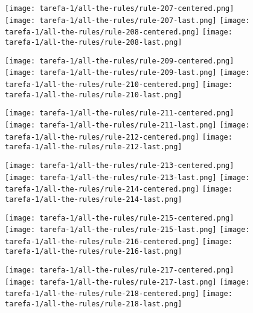 \begin{figure}[htbp]
  \centering
\texttt{[image: tarefa-1/all-the-rules/rule-207-centered.png]}
\texttt{[image: tarefa-1/all-the-rules/rule-207-last.png]}
\texttt{[image: tarefa-1/all-the-rules/rule-208-centered.png]}
\texttt{[image: tarefa-1/all-the-rules/rule-208-last.png]}
\end{figure}
\begin{figure}[htbp]
  \centering
\texttt{[image: tarefa-1/all-the-rules/rule-209-centered.png]}
\texttt{[image: tarefa-1/all-the-rules/rule-209-last.png]}
\texttt{[image: tarefa-1/all-the-rules/rule-210-centered.png]}
\texttt{[image: tarefa-1/all-the-rules/rule-210-last.png]}
\end{figure}
\begin{figure}[htbp]
  \centering
\texttt{[image: tarefa-1/all-the-rules/rule-211-centered.png]}
\texttt{[image: tarefa-1/all-the-rules/rule-211-last.png]}
\texttt{[image: tarefa-1/all-the-rules/rule-212-centered.png]}
\texttt{[image: tarefa-1/all-the-rules/rule-212-last.png]}
\end{figure}
\begin{figure}[htbp]
  \centering
\texttt{[image: tarefa-1/all-the-rules/rule-213-centered.png]}
\texttt{[image: tarefa-1/all-the-rules/rule-213-last.png]}
\texttt{[image: tarefa-1/all-the-rules/rule-214-centered.png]}
\texttt{[image: tarefa-1/all-the-rules/rule-214-last.png]}
\end{figure}
\begin{figure}[htbp]
  \centering
\texttt{[image: tarefa-1/all-the-rules/rule-215-centered.png]}
\texttt{[image: tarefa-1/all-the-rules/rule-215-last.png]}
\texttt{[image: tarefa-1/all-the-rules/rule-216-centered.png]}
\texttt{[image: tarefa-1/all-the-rules/rule-216-last.png]}
\end{figure}
\begin{figure}[htbp]
  \centering
\texttt{[image: tarefa-1/all-the-rules/rule-217-centered.png]}
\texttt{[image: tarefa-1/all-the-rules/rule-217-last.png]}
\texttt{[image: tarefa-1/all-the-rules/rule-218-centered.png]}
\texttt{[image: tarefa-1/all-the-rules/rule-218-last.png]}
\end{figure}
